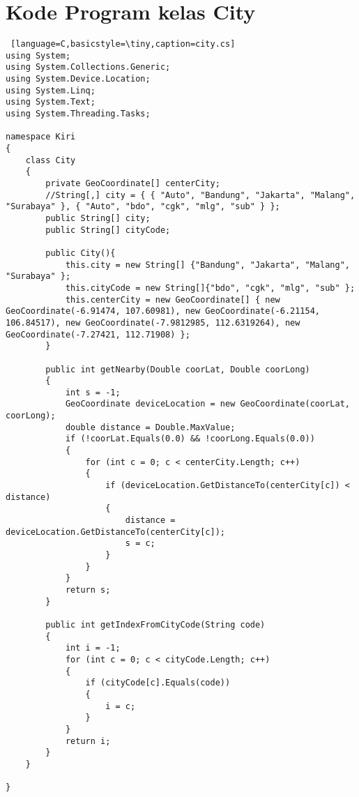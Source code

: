 \chapter{Kode Program kelas City}
\label{app:D}

\singlespacing 
%
%

\begin{lstlisting} [language=C,basicstyle=\tiny,caption=city.cs]
using System;
using System.Collections.Generic;
using System.Device.Location;
using System.Linq;
using System.Text;
using System.Threading.Tasks;

namespace Kiri
{
    class City
    {
        private GeoCoordinate[] centerCity;
        //String[,] city = { { "Auto", "Bandung", "Jakarta", "Malang", "Surabaya" }, { "Auto", "bdo", "cgk", "mlg", "sub" } };
        public String[] city;
        public String[] cityCode;

        public City(){
            this.city = new String[] {"Bandung", "Jakarta", "Malang", "Surabaya" };
            this.cityCode = new String[]{"bdo", "cgk", "mlg", "sub" };
            this.centerCity = new GeoCoordinate[] { new GeoCoordinate(-6.91474, 107.60981), new GeoCoordinate(-6.21154, 106.84517), new GeoCoordinate(-7.9812985, 112.6319264), new GeoCoordinate(-7.27421, 112.71908) };
        }

        public int getNearby(Double coorLat, Double coorLong)
        {
            int s = -1;
            GeoCoordinate deviceLocation = new GeoCoordinate(coorLat, coorLong);
            double distance = Double.MaxValue;
            if (!coorLat.Equals(0.0) && !coorLong.Equals(0.0))
            {
                for (int c = 0; c < centerCity.Length; c++)
                {
                    if (deviceLocation.GetDistanceTo(centerCity[c]) < distance)
                    {
                        distance = deviceLocation.GetDistanceTo(centerCity[c]);
                        s = c;
                    }
                }
            }
            return s;
        }

        public int getIndexFromCityCode(String code)
        {
            int i = -1;
            for (int c = 0; c < cityCode.Length; c++)
            {
                if (cityCode[c].Equals(code))
                {
                    i = c;
                }
            }
            return i;
        }
    }

}
\end{lstlisting}